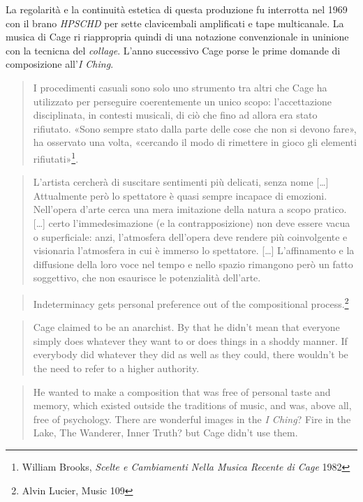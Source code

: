 \begin{multicols}{2}
La regolarit\`a e la continuit\`a estetica di questa produzione fu interrotta nel 1969
con il brano \emph{HPSCHD} per sette clavicembali amplificati e tape multicanale.
La musica di Cage ri riappropria quindi di una notazione convenzionale in uninione
con la tecnicna del \emph{collage}. L'anno successivo Cage porse le prime domande
di composizione all'\emph{I Ching}.

\begin{quote}
	I procedimenti casuali sono solo uno strumento tra altri che Cage ha utilizzato
	per perseguire coerentemente un unico scopo: l'accettazione disciplinata, in
	contesti musicali, di ci\`o che fino ad allora era stato rifiutato. «Sono sempre
	stato dalla parte delle cose che non si devono fare», ha osservato una volta,
	«cercando il modo di rimettere in gioco gli elementi rifiutati»\footnote{William
	Brooks, \emph{Scelte e Cambiamenti Nella Musica Recente di Cage} 1982}.
\end{quote}

\centering{***}

\begin{quote}
	L'artista cercher\`a di suscitare sentimenti pi\`u delicati, senza nome [\ldots]
	Attualmente per\`o lo spettatore \`e quasi sempre incapace di emozioni.
	Nell'opera d'arte cerca una mera imitazione della natura a scopo pratico.
	[\ldots] certo l'immedesimazione (e la contrapposizione) non deve essere
	vacua o superficiale: anzi, l'atmosfera dell'opera deve rendere pi\`u
	coinvolgente e visionaria l'atmosfera in cui \`e immerso lo spettatore. [\ldots]
	L'affinamento e la diffusione della loro voce nel tempo e nello spazio
	rimangono per\`o un fatto soggettivo, che non esaurisce le potenzialit\`a dell'arte.
\end{quote}

\begin{quote}
	Indeterminacy gets personal preference out of the compositional process.\footnote{Alvin Lucier, Music 109}
\end{quote}

\begin{quote}
    Cage claimed to be an anarchist. By that he didn't mean that everyone simply does whatever they want to or does things in a shoddy manner. If everybody did whatever they did as well as they could, there wouldn't be the need to refer to a higher authority.
\end{quote}

\begin{quote}
	He wanted to make a composition that was free of personal taste and memory, which existed outside the traditions of music, and was, above all, free of psychology.
There are wonderful images in the \emph{I Ching}? Fire in the Lake, The Wanderer, Inner Truth? but Cage didn't use them.
\end{quote}


\end{multicols}
